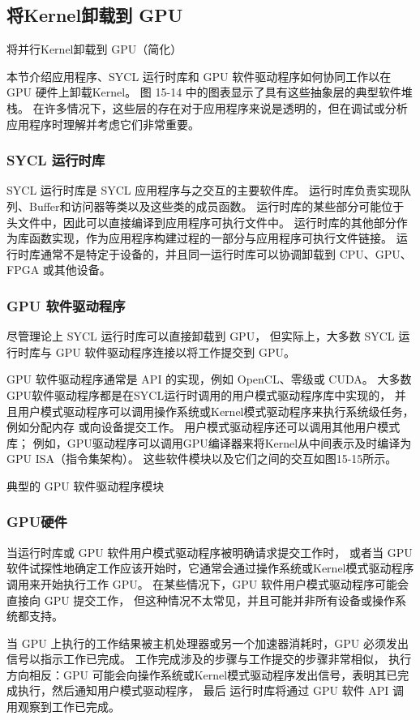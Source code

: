 \subsection{将Kernel卸载到 GPU}
{\color{red} 将并行Kernel卸载到 GPU（简化）}

本节介绍应用程序、SYCL 运行时库和 GPU 软件驱动程序如何协同工作以在 GPU 硬件上卸载Kernel。 
图 15-14 中的图表显示了具有这些抽象层的典型软件堆栈。 
在许多情况下，这些层的存在对于应用程序来说是透明的，但在调试或分析应用程序时理解并考虑它们非常重要。

\subsubsection{SYCL 运行时库}
SYCL 运行时库是 SYCL 应用程序与之交互的主要软件库。 
运行时库负责实现队列、Buffer和访问器等类以及这些类的成员函数。 
运行时库的某些部分可能位于头文件中，因此可以直接编译到应用程序可执行文件中。 
运行时库的其他部分作为库函数实现，作为应用程序构建过程的一部分与应用程序可执行文件链接。 
运行时库通常不是特定于设备的，并且同一运行时库可以协调卸载到 CPU、GPU、FPGA 或其他设备。

\subsubsection{GPU 软件驱动程序}
尽管理论上 SYCL 运行时库可以直接卸载到 GPU，
但实际上，大多数 SYCL 运行时库与 GPU 软件驱动程序连接以将工作提交到 GPU。

GPU 软件驱动程序通常是 API 的实现，例如 OpenCL、零级或 CUDA。 
大多数GPU软件驱动程序都是在SYCL运行时调用的用户模式驱动程序库中实现的，
并且用户模式驱动程序可以调用操作系统或Kernel模式驱动程序来执行系统级任务，例如分配内存 或向设备提交工作。 
用户模式驱动程序还可以调用其他用户模式库； 
例如，GPU驱动程序可以调用GPU编译器来将Kernel从中间表示及时编译为GPU ISA（指令集架构）。 
这些软件模块以及它们之间的交互如图15-15所示。

{\color{red} 典型的 GPU 软件驱动程序模块}

\subsubsection{GPU硬件}
当运行时库或 GPU 软件用户模式驱动程序被明确请求提交工作时，
或者当 GPU 软件试探性地确定工作应该开始时，它通常会通过操作系统或Kernel模式驱动程序调用来开始执行工作 GPU。 
在某些情况下，GPU 软件用户模式驱动程序可能会直接向 GPU 提交工作，
但这种情况不太常见，并且可能并非所有设备或操作系统都支持。

当 GPU 上执行的工作结果被主机处理器或另一个加速器消耗时，GPU 必须发出信号以指示工作已完成。 
工作完成涉及的步骤与工作提交的步骤非常相似，
执行方向相反：GPU 可能会向操作系统或Kernel模式驱动程序发出信号，表明其已完成执行，然后通知用户模式驱动程序，
最后 运行时库将通过 GPU 软件 API 调用观察到工作已完成。

